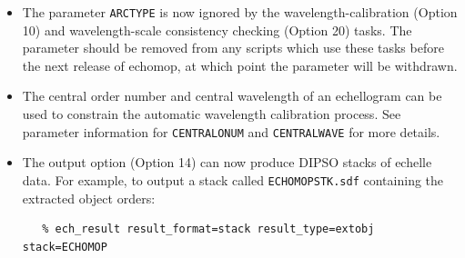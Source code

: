 \documentclass[twoside,11pt]{article}
\newcommand{\htmlref}[2]{#1}
\renewcommand{\_}{\texttt{\symbol{95}}}
\begin{document}
\begin{itemize}
\item The parameter \htmlref{{\tt{ARC\_TYPE}}}{par_ARC_TYPE} is
   now ignored by the wavelength-calibration
   (Option 10) and wavelength-scale consistency checking (Option 20)
   tasks.  The parameter should be removed from any scripts which use
   these tasks before the next release of {\sc echomop,} at which point the
   parameter will be withdrawn.
\item The central order number and central wavelength of an
   echellogram can be used to constrain the automatic wavelength
   calibration process.  See parameter information for
   \htmlref{{\tt{CENTRAL\_ONUM}}}{par_CENTRAL_ONUM}
   and \htmlref{{\tt{CENTRAL\_WAVE}}}{par_CENTRAL_WAVE} for more details.
\item The output option (Option 14) can now produce DIPSO stacks of
   echelle data.  For example, to output a stack called
   \texttt{ECHOMOP\_STK.sdf} containing the extracted object orders:

\begin{verbatim}
   % ech_result result_format=stack result_type=extobj stack=ECHOMOP
\end{verbatim}


\end{itemize}
\end{document}
